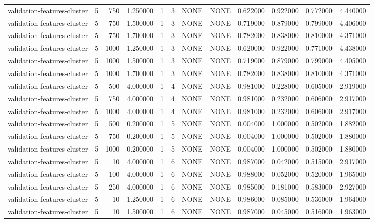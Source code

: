 \begin{tabular}{lrrrllllrrrr}
validation-features-cluster & 5 & 750 & 1.250000 & 1 & 3 & NONE & NONE & 0.622000 & 0.922000 & 0.772000 & 4.440000 \\
validation-features-cluster & 5 & 750 & 1.500000 & 1 & 3 & NONE & NONE & 0.719000 & 0.879000 & 0.799000 & 4.406000 \\
validation-features-cluster & 5 & 750 & 1.700000 & 1 & 3 & NONE & NONE & 0.782000 & 0.838000 & 0.810000 & 4.371000 \\
validation-features-cluster & 5 & 1000 & 1.250000 & 1 & 3 & NONE & NONE & 0.620000 & 0.922000 & 0.771000 & 4.438000 \\
validation-features-cluster & 5 & 1000 & 1.500000 & 1 & 3 & NONE & NONE & 0.719000 & 0.879000 & 0.799000 & 4.405000 \\
validation-features-cluster & 5 & 1000 & 1.700000 & 1 & 3 & NONE & NONE & 0.782000 & 0.838000 & 0.810000 & 4.371000 \\
validation-features-cluster & 5 & 500 & 4.000000 & 1 & 4 & NONE & NONE & 0.981000 & 0.228000 & 0.605000 & 2.919000 \\
validation-features-cluster & 5 & 750 & 4.000000 & 1 & 4 & NONE & NONE & 0.981000 & 0.232000 & 0.606000 & 2.917000 \\
validation-features-cluster & 5 & 1000 & 4.000000 & 1 & 4 & NONE & NONE & 0.981000 & 0.232000 & 0.606000 & 2.917000 \\
validation-features-cluster & 5 & 500 & 0.200000 & 1 & 5 & NONE & NONE & 0.004000 & 1.000000 & 0.502000 & 1.882000 \\
validation-features-cluster & 5 & 750 & 0.200000 & 1 & 5 & NONE & NONE & 0.004000 & 1.000000 & 0.502000 & 1.880000 \\
validation-features-cluster & 5 & 1000 & 0.200000 & 1 & 5 & NONE & NONE & 0.004000 & 1.000000 & 0.502000 & 1.880000 \\
validation-features-cluster & 5 & 10 & 4.000000 & 1 & 6 & NONE & NONE & 0.987000 & 0.042000 & 0.515000 & 2.917000 \\
validation-features-cluster & 5 & 100 & 4.000000 & 1 & 6 & NONE & NONE & 0.988000 & 0.052000 & 0.520000 & 1.965000 \\
validation-features-cluster & 5 & 250 & 4.000000 & 1 & 6 & NONE & NONE & 0.985000 & 0.181000 & 0.583000 & 2.927000 \\
validation-features-cluster & 5 & 10 & 1.250000 & 1 & 6 & NONE & NONE & 0.986000 & 0.085000 & 0.536000 & 1.964000 \\
validation-features-cluster & 5 & 10 & 1.500000 & 1 & 6 & NONE & NONE & 0.987000 & 0.045000 & 0.516000 & 1.963000 \\

\end{tabular}
